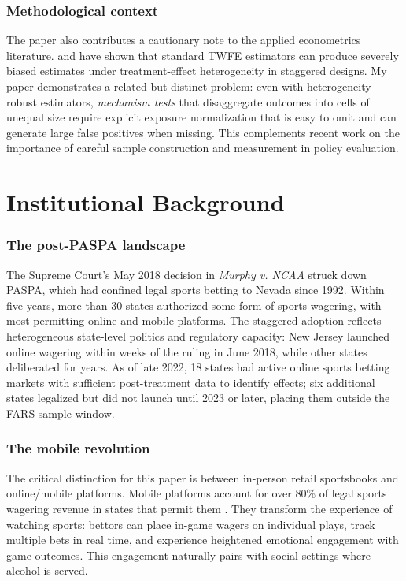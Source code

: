 \documentclass[12pt]{article}
\begin{document}
\subsubsection*{Methodological context} The paper also contributes a cautionary note to the applied econometrics literature. \citet{CallawayAndSantAnna2021} and \citet{SunAbraham2021} have shown that standard TWFE estimators can produce severely biased estimates under treatment-effect heterogeneity in staggered designs. My paper demonstrates a related but distinct problem: even with heterogeneity-robust estimators, \textit{mechanism tests} that disaggregate outcomes into cells of unequal size require explicit exposure normalization that is easy to omit and can generate large false positives when missing. This complements recent work on the importance of careful sample construction and measurement in policy evaluation.


\section{Institutional Background}

\subsubsection*{The post-PASPA landscape} The Supreme Court's May 2018 decision in \textit{Murphy v. NCAA} struck down PASPA, which had confined legal sports betting to Nevada since 1992. Within five years, more than 30 states authorized some form of sports wagering, with most permitting online and mobile platforms. The staggered adoption reflects heterogeneous state-level politics and regulatory capacity: New Jersey launched online wagering within weeks of the ruling in June 2018, while other states deliberated for years. As of late 2022, 18 states had active online sports betting markets with sufficient post-treatment data to identify effects; six additional states legalized but did not launch until 2023 or later, placing them outside the FARS sample window.

\subsubsection*{The mobile revolution} The critical distinction for this paper is between in-person retail sportsbooks and online/mobile platforms. Mobile platforms account for over 80\% of legal sports wagering revenue in states that permit them \citep{AGA2023}. They transform the experience of watching sports: bettors can place in-game wagers on individual plays, track multiple bets in real time, and experience heightened emotional engagement with game outcomes. This engagement naturally pairs with social settings where alcohol is served.
\end{document}
